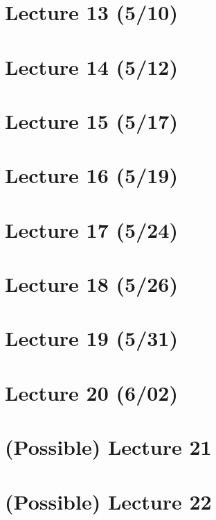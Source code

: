 \section{Lecture 13 (5/10)}

\newpage

\section{Lecture 14 (5/12)}

\newpage

\section{Lecture 15 (5/17)}

\newpage

\section{Lecture 16 (5/19)}

\newpage

\section{Lecture 17 (5/24)}

\newpage

\section{Lecture 18 (5/26)}

\newpage

\section{Lecture 19 (5/31)}

\newpage

\section{Lecture 20 (6/02)}

\newpage

\section{(Possible) Lecture 21}

\newpage

\section{(Possible) Lecture 22}

\newpage

